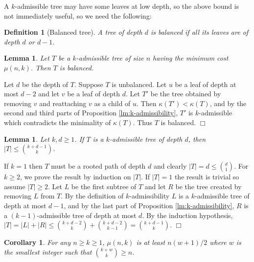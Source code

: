\documentclass[11pt]{article}
\newtheorem{corollary}[theorem]{Corollary}
\newtheorem{lemma}[theorem]{Lemma}
\newtheorem{definition}[theorem]{Definition}
\newcommand{\qed}{$\Box$}
\newenvironment{proof}{\noindent {\bf Proof:}}{\hfill \qed \smallskip}
\begin{document}
A $k$-admissible tree may have some leaves at low depth, so the above bound is not immediately useful, so we need
the following:

\begin{definition}[Balanced tree]
A tree of depth $d$ is balanced if all its leaves are of depth $d$ or $d - 1$.
\end{definition}


\begin{lemma}
\label{lm:balanced}
Let $T$ be a $k$-admissible tree of size $n$ having the minimum cost $\mu(n,k)$. Then $T$ is balanced.
\end{lemma}

\begin{proof}  %
Let $d$ be the depth of $T$.  Suppose $T$ is unbalanced.
Let $u$ be a leaf  of depth at most $d-2$ and let $v$ be a leaf of depth $d$.
Let $T'$ be the tree obtained by  
removing $v$ and reattaching $v$ as a child of  $u$. Then $\kappa(T') <\kappa(T)$, and  
by the second and third parts of Proposition \ref{lm:k-admissibility}, $T'$ is $k$-admissible which contradicts the minimality of $\kappa(T)$.
Thus $T$ is balanced.
\end{proof}


\begin{lemma}
\label{lm:k-d-size}
Let $k,d \geq 1$. If $T$ is a $k$-admissible tree of depth $d$,
then $|T| \leq \binom{k + d - 1}{k}$.
\end{lemma}
\begin{proof}
If $k=1$ then $T$ must be a rooted path of depth $d$ and clearly $|T|=d\le \binom{d}{1}$. 
For $k\ge 2$, we prove the result by induction on $|T|$.  If $|T|=1$ the result is trivial so
assume $|T| \geq 2$.  Let $L$ be the first subtree of $T$ and let $R$ be the tree created by removing $L$ from $T$. By the definition of $k$-admissibility
$L$ is a $k$-admissible tree of depth at most $d-1$, and by the last part of
Proposition \ref{lm:k-admissibility}, $R$ is a $(k-1)$-admissible tree of depth at most $d$.
By the induction hypothesis, $|T| = |L| + |R| \leq \binom{k + d - 2}{k} + \binom{k + d - 2}{k - 1} = \binom{k + d - 1}{k}$.
\end{proof}

\begin{corollary}
\label{cor:mu}
For any $n \geq k \geq 1$, $\mu(n,k)$ is at least $n(w+1)/2$ 
where $w$ is the smallest integer such that $\binom{k+w}{k} \geq n$.
\end{corollary}
\end{document}
